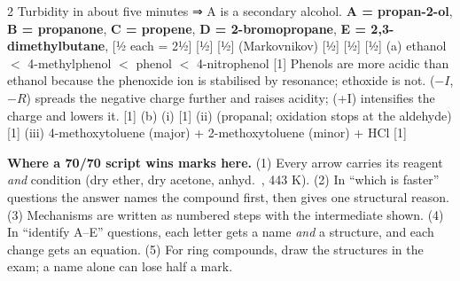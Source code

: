 \documentclass[10pt,a4paper]{extarticle}
\newcommand{\mk}[1]{{\scriptsize\color{black!55}[#1]}}
\begin{document}
\begin{multicols}{2}
\An Turbidity in about five minutes ⇒ A is a secondary alcohol.\nl
\textbf{A = propan-2-ol},  \quad \textbf{B = propanone}, \nl
\textbf{C = propene},  \quad \textbf{D = 2-bromopropane}, \nl
\textbf{E = 2,3-dimethylbutane},  \mk{½ each = 2½}\nl
{} \mk{½}\nl
{} \mk{½}\nl
{} (Markovnikov) \mk{½}\nl
{} \mk{½}\nl
{} \mk{½}
\An (a) ethanol $<$ 4-methylphenol $<$ phenol $<$ 4-nitrophenol \mk{1}\nl
Phenols are more acidic than ethanol because the phenoxide ion is stabilised by resonance; ethoxide is not.  ($-I$, $-R$) spreads the negative charge further and raises acidity;  (+I) intensifies the charge and lowers it. \mk{1}\nl
(b) (i)  \mk{1}\nl
(ii)  (propanal; oxidation stops at the aldehyde) \mk{1}\nl
(iii)  4-methoxytoluene (major) + 2-methoxytoluene (minor) + HCl \mk{1}
\end{multicols}
\begin{tcolorbox}[enhanced,colback=tipY,colframe=tipYframe,boxrule=0.5pt,arc=1.5pt,left=4pt,right=4pt,top=2pt,bottom=2pt,before skip=4pt]
\footnotesize\textbf{Where a 70/70 script wins marks here.} (1) Every arrow carries its reagent \emph{and} condition (dry ether, dry acetone, anhyd.\ , 443 K). (2) In ``which is faster'' questions the answer names the compound first, then gives one structural reason. (3) Mechanisms are written as numbered steps with the intermediate shown. (4) In ``identify A--E'' questions, each letter gets a name \emph{and} a structure, and each change gets an equation. (5) For ring compounds, draw the structures in the exam; a name alone can lose half a mark.
\end{tcolorbox}
\end{document}
